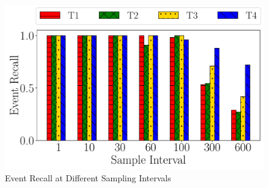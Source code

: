 \begin{figure}
    \centering
    \includegraphics[width=\linewidth]{FIGS/fig-random-select-interval-recall-hatch.pdf}
\caption{Event Recall at Different Sampling Intervals}
\label{fig:sampling-only}
\end{figure}


